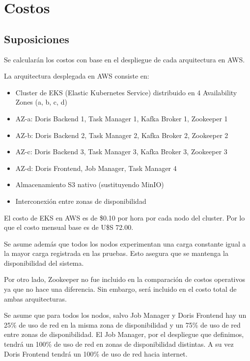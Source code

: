 \section{Costos}

\subsection{Suposiciones}
Se calcularán los costos con base en el despliegue de cada arquitectura en AWS.

La arquitectura desplegada en AWS consiste en:

\begin{itemize}
    \item Cluster de EKS (Elastic Kubernetes Service) distribuido en 4 Availability Zones (a, b, c, d)
    \item AZ-a: Doris Backend 1, Task Manager 1, Kafka Broker 1, Zookeeper 1
    \item AZ-b: Doris Backend 2, Task Manager 2, Kafka Broker 2, Zookeeper 2
    \item AZ-c: Doris Backend 3, Task Manager 3, Kafka Broker 3, Zookeeper 3
    \item AZ-d: Doris Frontend, Job Manager, Task Manager 4
    \item Almacenamiento S3 nativo (sustituyendo MinIO)
    \item Interconexión entre zonas de disponibilidad
\end{itemize}

El costo de EKS en AWS es de \$0.10 por hora por cada nodo del cluster.
Por lo que el costo mensual base es de U\$S 72.00. \newline

Se asume además que todos los nodos experimentan una carga constante igual a la mayor carga registrada en las pruebas. 
Esto asegura que se mantenga la disponibilidad del sistema.\newline

Por otro lado, Zookeeper no fue incluido en la comparación de costos operativos ya que no hace una diferencia. 
Sin embargo, será incluido en el costo total de ambas arquitecturas. \newline

Se asume que para todos los nodos, salvo Job Manager y Doris Frontend hay un 25\% de uso de red en la misma zona de disponibilidad y un 75\% de uso de red entre zonas de disponibilidad.
El Job Manager, por el despliegue que definimos, tendrá un 100\% de uso de red en zonas de disponibilidad distintas.
A su vez Doris Frontend tendrá un 100\% de uso de red hacia internet. \newline


